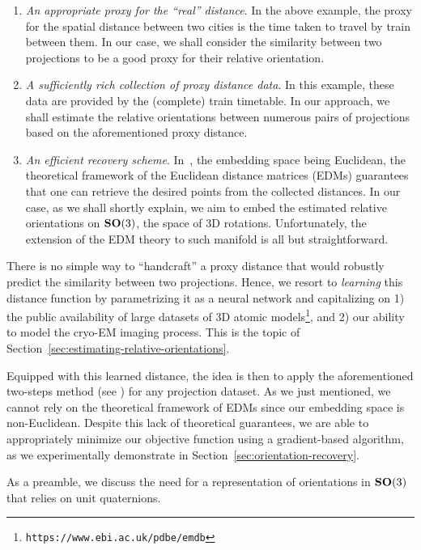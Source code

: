 \begin{enumerate}
    \item \textit{An appropriate proxy for the ``real'' distance}. In the above example, the proxy for the spatial distance between two cities is the time taken to travel by train between them. In our case, we shall consider the similarity between two projections to be a good proxy for their relative orientation.
    \item \textit{A sufficiently rich collection of proxy distance data}. In this example, these data are provided by the (complete) train timetable. In our approach, we shall estimate the relative orientations between numerous pairs of projections based on the aforementioned proxy distance.
    \item \textit{An efficient recovery scheme}. In~\cite{dokmanic2015euclidean}, the embedding space being Euclidean, the theoretical framework of the Euclidean distance matrices (EDMs) guarantees that one can retrieve the desired points from the collected distances. In our case, as we shall shortly explain, we aim to embed the estimated relative orientations on $\mathrm{\mathbf{SO}}(3)$, the space of 3D rotations. Unfortunately, the extension of the EDM theory to such manifold is all but straightforward.
\end{enumerate}

There is no simple way to ``handcraft'' a proxy distance that would robustly predict the similarity between two projections. Hence, we resort to \textit{learning} this distance function by parametrizing it as a neural network and capitalizing on 1) the public availability of large datasets of 3D atomic models\footnote{\texttt{https://www.ebi.ac.uk/pdbe/emdb}}, and 2) our ability to model the cryo-EM imaging process. This is the topic of Section~\ref{sec:estimating-relative-orientations}.

Equipped with this learned distance, the idea is then to apply the aforementioned two-steps method (see ) for any projection dataset. As we just mentioned, we cannot rely on the theoretical framework of EDMs since our embedding space is non-Euclidean. Despite this lack of theoretical guarantees, we are able to appropriately minimize our objective function using a gradient-based algorithm, as we experimentally demonstrate in Section~\ref{sec:orientation-recovery}.

As a preamble, we discuss the need for a representation of orientations in $\mathrm{\mathbf{SO}}(3)$ that relies on unit quaternions.

